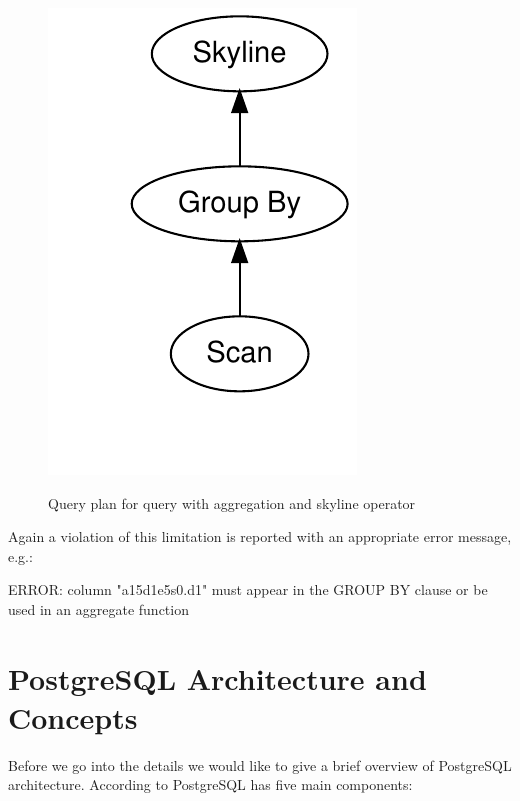 \begin{figure}[htbp]
\centering
\includegraphics[scale=0.5]{plots-qp/qp-agg-skyline}\\
\caption{Query plan for query with aggregation and skyline operator}
\label{fig:qp-agg-skyline}
\end{figure}

\noindent
Again a violation of this limitation is reported with an appropriate
error message, e.g.:

\begin{interactive}
ERROR:  column "a15d1e5s0.d1" must appear in the GROUP BY clause or be used 
in an aggregate function
\end{interactive}


\section{PostgreSQL Architecture and Concepts}

Before we go into the details we would like to give a brief overview
of PostgreSQL architecture. According to \citep{Conway2006a} PostgreSQL
has five main components:

